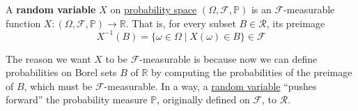   \begin{definition}
    \label{def:random-variable}
    A \textbf{random variable} $X$ on \hyperref[def:probability-space]{probability space} $(\Omega, \mathcal{F}, \mathbb{P})$ is an $\mathcal{F}$-measurable function $X: (\Omega, \mathcal{F}, \mathbb{P}) \to \mathbb{R}$. That is, for every subset $B \in \mathcal{R}$, its preimage 
    \begin{equation}
      X^{-1} (B) = \{\omega \in \Omega \mid X(\omega) \in B\} \in \mathcal{F}
    \end{equation}
  \end{definition}

  The reason we want $X$ to be $\mathcal{F}$-measurable is because now we can define probabilities on Borel sets $B$ of $\mathbb{R}$ by computing the probabilities of the preimage of $B$, which must be $\mathcal{F}$-measurable. In a way, a \hyperref[def:random-variable]{random variable} ``pushes forward'' the probability measure $\mathbb{P}$, originally defined on $\mathcal{F}$, to $\mathcal{R}$.  


